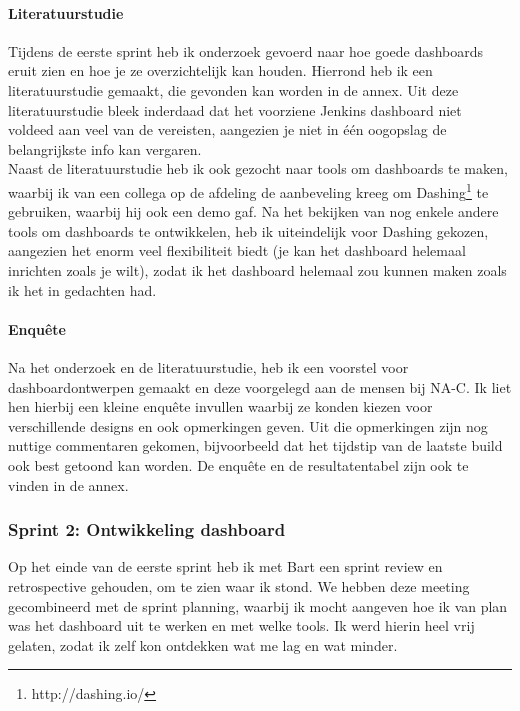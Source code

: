\documentclass[10pt,a4paper]{article}
\begin{document}
\paragraph{Literatuurstudie} Tijdens de eerste sprint heb ik onderzoek gevoerd naar hoe goede dashboards eruit zien en hoe je ze overzichtelijk kan houden. Hierrond heb ik een literatuurstudie gemaakt, die gevonden kan worden in de annex.  Uit deze literatuurstudie bleek inderdaad dat het voorziene Jenkins dashboard niet voldeed aan veel van de vereisten, aangezien je niet in \'e\'en oogopslag de belangrijkste info kan vergaren.\\
Naast de literatuurstudie heb ik ook gezocht naar tools om dashboards te maken, waarbij ik van een collega op de afdeling de aanbeveling kreeg om Dashing\footnote{http://dashing.io/} te gebruiken, waarbij hij ook een demo gaf.  Na het bekijken van nog enkele andere tools om dashboards te ontwikkelen, heb ik uiteindelijk voor Dashing gekozen, aangezien het enorm veel flexibiliteit biedt (je kan het dashboard helemaal inrichten zoals je wilt),  zodat ik het dashboard helemaal zou kunnen maken zoals ik het in gedachten had. 
\paragraph{Enqu\^ete}
Na het onderzoek en de literatuurstudie, heb ik een voorstel voor dashboardontwerpen gemaakt en deze voorgelegd aan de mensen bij NA-C. Ik liet hen hierbij een kleine enqu\^ete invullen waarbij ze konden kiezen voor verschillende designs en ook opmerkingen geven. Uit die opmerkingen zijn nog nuttige commentaren gekomen, bijvoorbeeld dat het tijdstip van de laatste build ook best getoond kan worden. De enqu\^ete en de resultatentabel zijn ook te vinden in de annex. 
\subsubsection{Sprint 2: Ontwikkeling dashboard} 
\label{sprint2}
Op het einde van de eerste sprint heb ik met Bart een sprint review en retrospective gehouden, om te zien waar ik stond. We hebben deze meeting gecombineerd met de sprint planning, waarbij ik mocht aangeven hoe ik van plan was het dashboard uit te werken en met welke tools. Ik werd hierin heel vrij gelaten, zodat ik zelf kon ontdekken wat me lag en wat minder. 
\end{document}
